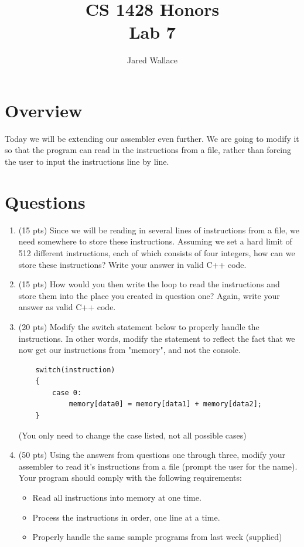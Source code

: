 \documentclass[letterpaper,12pt]{article}
\title{\Large CS 1428 Honors\\Lab 7}
\author{Jared Wallace}
\date{}
\begin{document}
\maketitle

\vspace{30mm}

\section*{Overview}
Today we will be extending our assembler even further. We are going to modify it so that
the program can read in the instructions from a file, rather than forcing the user
to input the instructions line by line.
\section*{Questions}
\begin{enumerate}
    \item (15 pts) Since we will be reading in several lines of instructions from a file,
        we need somewhere to store these instructions. Assuming we set a hard limit of
        512 different instructions, each of which consists of four integers, how can we
        store these instructions? Write your answer in valid C++ code.
    \vspace{30mm}
    \item (15 pts) How would you then write the loop to read the instructions and
        store them into the place you created in question one? Again, write your answer
        as valid C++ code.
    \vspace{30mm}
\item (20 pts) Modify the switch statement below to properly handle the instructions. In
    other words, modify the statement to reflect the fact that we now get our instructions
    from "memory", and not the console.
    \begin{lstlisting}
    switch(instruction)
    {
        case 0:
            memory[data0] = memory[data1] + memory[data2];
    }
    \end{lstlisting}
    (You only need to change the case listed, not all possible cases)
    \vspace{40mm}
\item (50 pts) Using the answers from questions one through three, modify your
    assembler to read it's instructions from a file (prompt the user for the name).
    Your program should comply with the following requirements:
    \begin{itemize}
        \item Read all instructions into memory at one time.
        \item Process the instructions in order, one line at a time.
        \item Properly handle the same sample programs from last week (supplied)
    \end{itemize}
\end{enumerate}
\end{document}
